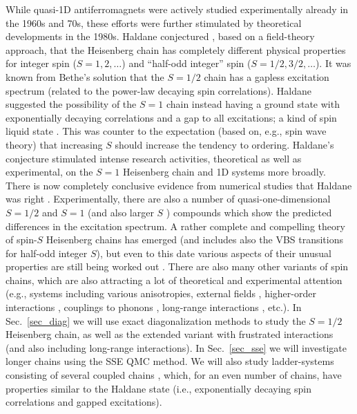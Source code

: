 \documentclass[draft,numberedheadings]{aipproc}
\begin{document}
While quasi-1D antiferromagnets were actively studied experimentally already in the 1960s and 70s, these efforts were further stimulated by 
theoretical developments in the 1980s. Haldane conjectured \cite{haldane1}, based on a field-theory approach, that the  Heisenberg chain has completely 
different physical properties for integer spin ($S=1,2,\ldots$) and ``half-odd integer'' spin ($S=1/2,3/2,\ldots$). It was known from Bethe's 
solution that the $S=1/2$ chain has a gapless excitation spectrum (related to the power-law decaying spin correlations). Haldane suggested the possibility 
of the $S=1$ chain instead having a ground state with exponentially decaying correlations and a gap to all excitations; a kind of spin liquid state 
\cite{aklt}. This was counter to the expectation (based on, e.g., spin wave theory) that increasing $S$ should increase the tendency to ordering. 
Haldane's conjecture stimulated intense research activities, theoretical as well as experimental, 
on the $S=1$ Heisenberg chain and 1D systems more broadly. There is now completely conclusive evidence from numerical studies that Haldane 
was right \cite{nomura89,liang90,schollwock96}. Experimentally, there are also a number of quasi-one-dimensional $S=1/2$ \cite{tennant93} and 
$S=1$ \cite{regnault94} (and also larger $S$ \cite{granroth96}) compounds which show the predicted differences in the excitation spectrum. 
A rather complete and compelling theory of spin-$S$ Heisenberg chains has emerged (and includes also the VBS transitions for half-odd integer $S$), 
but even to this date various aspects of their unusual properties are still being worked out \cite{pereira}. There are also many other variants of 
spin chains, which are also attracting a lot of theoretical and experimental attention (e.g., systems including various anisotropies, external fields 
\cite{caux05}, higher-order interactions \cite{lauchli06}, couplings to phonons \cite{sandvik99b,michel07}, long-range interactions 
\cite{laflorencie,awslr}, etc.). In Sec.~\ref{sec_diag} we will use exact diagonalization methods to study the $S=1/2$ Heisenberg chain, as well as 
the extended variant with frustrated interactions (and also including long-range interactions).  In Sec.~\ref{sec_sse} we will investigate longer 
chains using the SSE QMC method. We will also study ladder-systems consisting of several coupled chains \cite{dagotto1}, which, for an even number 
of chains, have properties similar to the Haldane state (i.e., exponentially decaying spin correlations and gapped excitations).
\end{document}
